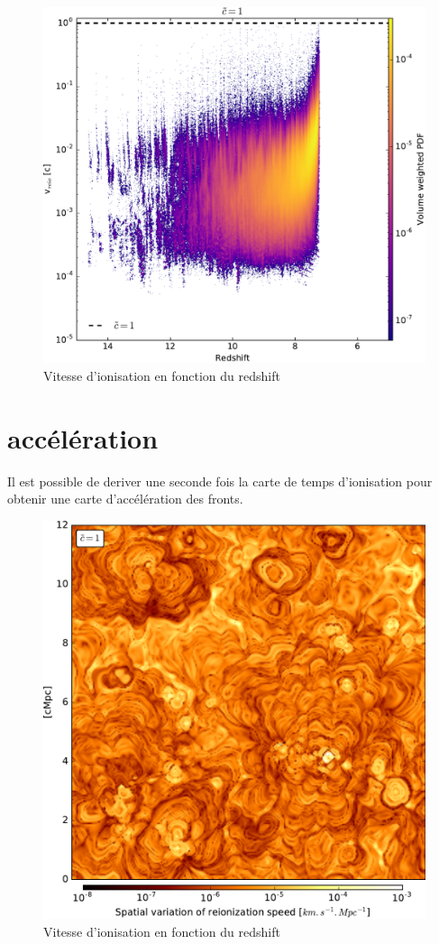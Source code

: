 \begin{figure}[htpb]
        \includegraphics[width=.95\linewidth]{img/04_mapreio/speedreio_z_c1.pdf} 
        \caption{Vitesse d'ionisation en fonction du redshift
        }
 		\label{fig:speedz}
\end{figure}


\section{accélération}
Il est possible de deriver une seconde fois la carte de temps d'ionisation pour obtenir une carte d'accélération des fronts.

\begin{figure}[htpb]
        \includegraphics[width=.95\linewidth]{img/04_mapreio/map_acc_c1.pdf} 
        \caption{Vitesse d'ionisation en fonction du redshift
        }
 		\label{fig:speedz}
\end{figure}


